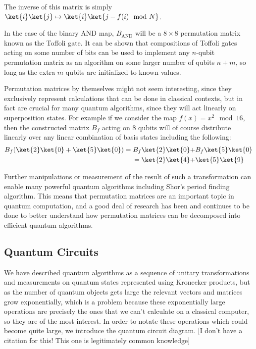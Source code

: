 The inverse of this matrix is simply $\ket{i}\ket{j} \mapsto \ket{i}\ket{j-f(i) \mod N}$.

In the case of the binary AND map, $B_{\text{AND}}$ will be a $8\times8$ permutation matrix known as the Toffoli gate. It can be shown that compositions of Toffoli gates acting on some number of bits can be used to implement any $n$-qubit permutation matrix as an algorithm on some larger number of qubits $n+m$, so long as the extra $m$ qubits are initialized to known values.

Permutation matrices by themselves might not seem interesting, since they exclusively represent calculations that can be done in classical contexts, but in fact are crucial for many quantum algorithms, since they will act linearly on superposition states. For example if we consider the map $f(x) = x^2\mod 16$, then the constructed matrix $B_f$ acting on 8 qubits will of course distribute linearly over any linear combination of basis states including the following:
\begin{align*}
	B_f(\ket{2}\ket{0}+\ket{5}\ket{0}) 
	= B_f\ket{2}\ket{0} +& B_f\ket{5}\ket{0}
	\\= \ket{2}\ket{4} +& \ket{5}\ket{9}
\end{align*}

Further manipulations or measurement of the result of such a transformation can enable many powerful quantum algorithms including Shor's period finding algorithm. This means that permutation matrices are an important topic in quantum computation, and a good deal of research has been and continues to be done to better understand how permutation matrices can be decomposed into efficient quantum algorithms.

\subsection{Quantum Circuits}
We have described quantum algorithms as a sequence of unitary transformations and measurements on quantum states represented using Kronecker products, but as the number of quantum objects gets large the relevant vectors and matrices grow exponentially, which is a problem because these exponentially large operations are precisely the ones that we can't calculate on a classical computer, so they are of the most interest. In order to notate these operations which could become quite large, we introduce the quantum circuit diagram. [I don't have a citation for this! This one is legitimately common knowledge]

